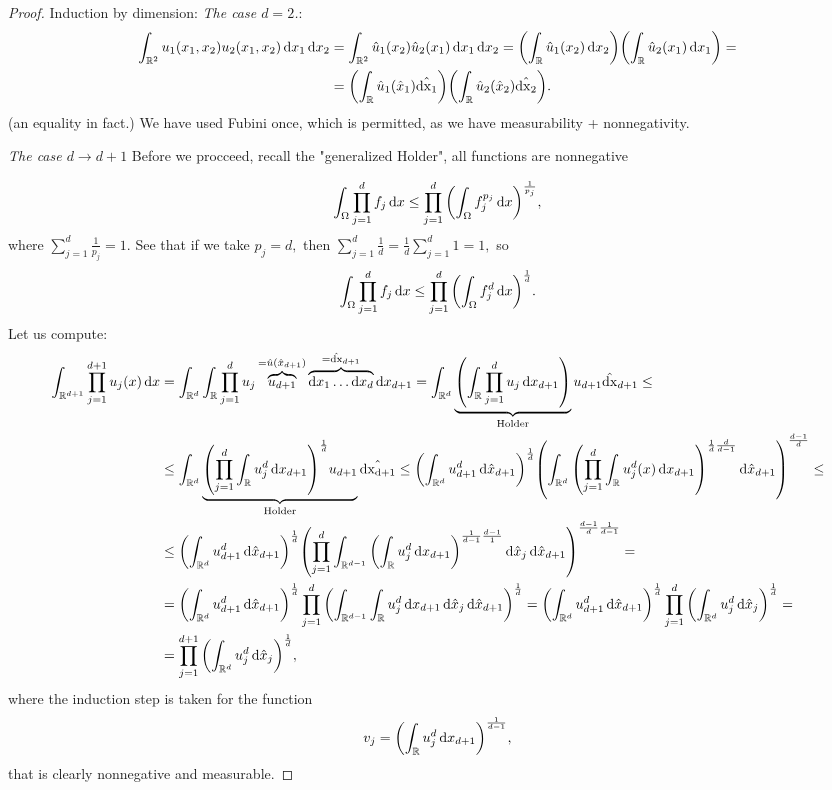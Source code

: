 \documentclass{article}
\begin{document}
\begin{proof}
	Induction by dimension:
	\textit{The case $d = 2$.}:
	\begin{align*}
		\int_{{\mathbb R}^{2}}u_1\qty(x_1,x_2)u_2\qty(x_1,x_2)\dd{x}_1 \dd{x}_2 &= \int_{{\mathbb R}^{2}}\hat{u}_1\qty(x_2) \hat{u}_2\qty(x_1)\dd{x}_1 \dd{x}_2 = \qty(\int_{{\mathbb R}}\hat{u}_1\qty(x_2)\dd{x}_2) \qty(\int_{{\mathbb R}}\hat{u}_2\qty(x_1)\dd{x}_1) = \\
		&=\qty(\int_{{\mathbb R}}\hat{u}_1\qty(\hat{x}_1)\hat{\dd{x}_1})\qty(\int_{{\mathbb R}}\hat{u}_2\qty(\hat{x}_2)\hat{\dd{x}_2}).
	\end{align*}
	(an equality in fact.) We have used Fubini once, which is permitted, as we have measurability + nonnegativity.

	\textit{The case $d \to d+1$}
	Before we procceed, recall the "generalized Holder", all functions are nonnegative

	\[
		\int_{\Omega}\prod_{j=1}^d f_j\dd{x} \leq \prod_{j=1}^d \qty(\int_{\Omega}f_j^{p_j}\dd{x})^{\frac{1}{p_j}},
	\]
	where $\sum_{j=1}^d \frac{1}{p_j}  = 1.$ See that if we take $p_j = d,$ then $\sum_{j=1}^d \frac{1}{d} = \frac{1}{d} \sum_{j=1}^d 1 =1,$ so
	\[
		\int_{\Omega}\prod_{j=1}^d f_j \dd{x} \leq \prod_{j=1}^d\qty(\int_{\Omega}f_j^d\dd{x})^{\frac{1}{d}}.
	\]
	Let us compute:
	\begin{align*}
		\int_{{\mathbb R}^{d+1}}\prod_{j=1}^{d+1} u_j\qty(x)\dd{x}&=\int_{{\mathbb R}^d}\int_{{\mathbb R}}\prod_{j=1}^d u_j \overbrace{u_{d+1}}^{=\hat{u}\qty(\hat{x}_{d+1})}\overbrace{\dd{x}_1 \dots \dd{x}_d}^{=\hat{\dd{x}}_{d+1}}\dd{x}_{d+1} = \int_{{\mathbb R}^{d}}\underbrace{\qty(\int_{{\mathbb R}}\prod_{j=1}^d u_j\dd{x}_{d+1})}_{\text{Holder}}u_{d+1}\hat{\dd{x}}_{d+1} \leq \\
								 &\leq \int_{{\mathbb R}^d}\underbrace{\qty(\prod_{j=1}^d \int_{{\mathbb R}}u_j^d\dd{x_{d+1}})^{\frac{1}{d}}u_{d+1}}_{\text{Holder}}\hat{\dd{x_{d+1}}} \leq \qty(\int_{{\mathbb R}^{d}}u_{d+1}^d\dd{\hat{x}_{d+1}})^{\frac{1}{d}}\qty(\int_{{\mathbb R}^d}\qty(\prod_{j=1}^d \int_{{\mathbb R}}u_j^d(x)\dd{x_{d+1}})^{\frac{1}{d}\frac{d}{d-1}}\dd{\hat{x}_{d+1}})^{\frac{d-1}{d}} \leq \\
								 &\leq \qty(\int_{{\mathbb R}^d}u_{d+1}^d\dd{\hat{x}_{d+1}})^{\frac{1}{d}}\qty(\prod_{j=1}^d\int_{{\mathbb R}^{d-1}}\qty(\int_{{\mathbb R}}u_j^d\dd{x_{d+1}})^{\frac{1}{d-1}\frac{d-1}{1}}\dd{\hat{x}_j}\dd{\hat{x}_{d+1}})^{\frac{d-1}{d} \frac{1}{d-1}} = \\
								 &= \qty(\int_{{\mathbb R}^{d}}u_{d+1}^d \dd{\hat{x}_{d+1}})^{\frac{1}{d}}\prod_{j=1}^d\qty(\int_{{\mathbb R}^{d-1}}\int_{{\mathbb R}}u_j^d\dd{x}_{d+1}\dd{\hat{x}_{j}}\dd{\hat{x}_{d+1}})^{\frac{1}{d}} = \qty(\int_{{\mathbb R}^{d}}u_{d+1}^d\dd{\hat{x}_{d+1}})^\frac{1}{d} \prod_{j=1}^d \qty(\int_{{\mathbb R}^{d}}u_j^d\dd{\hat{x}_j})^{\frac{1}{d}} = \\
								 &= \prod_{j=1}^{d+1} \qty(\int_{{\mathbb R}^{d}}u_j^d\dd{\hat{x}_j})^{\frac{1}{d}},
	\end{align*}
	where the induction step is taken for the function
	\[
		v_j=\qty(\int_{{\mathbb R}}u_j^d\dd{x_{d+1}})^{\frac{1}{d-1}},
	\]
	that is clearly nonnegative and measurable.
\end{proof}
\end{document}
